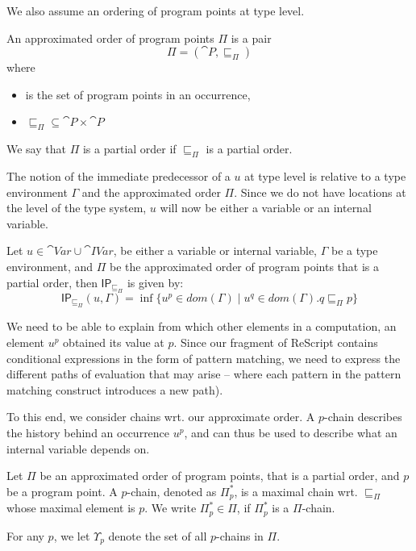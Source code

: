 \documentclass{llncs}
\newcommand{\uf}{\ensuremath{\mathsf{IP}}}
\newcommand{\sqleq}{\ensuremath{\sqsubseteq\xspace}}
\begin{document}
We also assume an ordering of program points at type level.

\begin{definition}
	An approximated order of program points $\Pi$ is a pair
	\[ \Pi=(\cat{P},\sqleq_\Pi) \]
	where
	\begin{itemize}
		\item {} is the set of program points in an occurrence,
		\item $\sqleq_\Pi\subseteq\cat{P}\times\cat{P}$
	\end{itemize}
	We say that $\Pi$ is a partial order if $\sqleq_\Pi$ is a partial order.
\end{definition}

The notion of the immediate predecessor of a $u$ at type level is
relative to a type environment $\Gamma$ and the approximated order
$\Pi$. Since we do not have locations at the level of the type system,
$u$ will now be either a variable or an internal variable.

\begin{definition}\label{def:GBindPi}
	Let $u\in \cat{Var}\cup\cat{IVar}$, be either a variable or
        internal variable, $\Gamma$ be a type environment, and $\Pi$
        be the approximated order of program points that is a partial
        order, then $\uf_{\sqleq_\Pi}$ is given by: 
	\[ \uf_{\sqleq_\Pi}(u,\Gamma)=\inf\{u^p\in
          dom(\Gamma)\mid u^q\in dom(\Gamma).q\sqleq_\Pi p\} \]
\end{definition}

We need to be able to explain from which other elements in a
computation, an element $u^p$ obtained its value at $p$. Since our
fragment of ReScript contains conditional expressions in the form of
pattern matching, we need to express the different paths of evaluation
that may arise -- where each pattern in the pattern matching construct
introduces a new path).

To this end, we consider chains wrt. our approximate order. 
A $p$-chain describes the history behind an occurrence $u^p$, and can
thus be used to describe what an internal variable depends on. 

\begin{definition}[$p$-chains]
	Let $\Pi$ be an approximated order of program points, that is a partial order, and $p$ be a program point.
A $p$-chain, denoted as $\Pi_p^{*}$, is a maximal chain
wrt. $\sqleq_\Pi$ whose maximal element is $p$. We write
$\Pi_p^{*}\in\Pi$, if $\Pi_p^{*}$ is a $\Pi$-chain.

For any $p$, we let $\Upsilon_p$ denote the set of all $p$-chains in
$\Pi$.
\end{definition}
\end{document}
